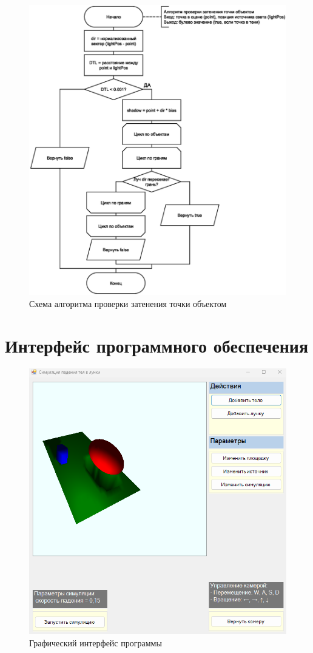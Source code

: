 \begin{figure}[h!]
    \centering
    \includegraphics[scale=0.5]{img/shadow.eps}
    \caption{Схема алгоритма проверки затенения точки объектом}
    \label{fig:shadow}
\end{figure}


\vspace{5mm}

\section{Интерфейс программного обеспечения}
\begin{figure}[h!]
    \centering
    \includegraphics[width=0.4\linewidth]{img/int-1-2.png}
    \caption{Графический интерфейс программы}
    \label{fig:int-1}
\end{figure}

